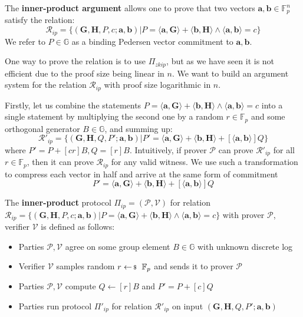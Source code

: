 \documentclass[../lecture-notes-148x210.tex]{subfiles}
\begin{document}
The \textbf{inner-product argument} allows one to prove that two vectors $\mathbf{a,b} \in \mathbb{F}_p^n$ satisfy the relation:
$$\mathcal{R}_{ip} = \{ (\mathbf{G,H}, P, c; \mathbf{a,b}) \vert P = \langle \mathbf{a,G} \rangle + \langle \mathbf{b,H} \rangle \wedge \langle \mathbf{a,b} \rangle = c \}$$
We refer to $P \in \mathbb{G}$ as a binding Pedersen vector commitment to $\mathbf{a,b}$.

One way to prove the relation is to use $\Pi_{zkip}$, but as we have seen it is not efficient due to the proof size being linear in $n$. We want to build an argument system for the relation $\mathcal{R}_{ip}$ with proof size logarithmic in $n$.

Firstly, let us combine the statements $P = \langle \mathbf{a,G} \rangle + \langle \mathbf{b,H} \rangle \wedge \langle \mathbf{a,b} \rangle = c$ into a single statement by multiplying the second one by a random $r \in \mathbb{F}_p$ and some orthogonal generator $B \in \mathbb{G}$, and summing up:
$$
\mathcal{R}'_{ip} = \{ (\mathbf{G,H}, Q, P'; \mathbf{a,b}) \vert P' = \langle \mathbf{a,G} \rangle + \langle \mathbf{b,H} \rangle + [\langle \mathbf{a,b} \rangle]Q \}
$$
where $P' = P + [cr]B, Q=[r]B$. Intuitively, if prover $\mathcal{P}$ can prove $\mathcal{R}'_{ip}$ for all $r \in \mathbb{F}_p$, then it can prove $\mathcal{R}_{ip}$ for any valid witness. We use such a transformation to compress each vector in half and arrive at the same form of commitment
$$P' = \langle \mathbf{a,G} \rangle + \langle \mathbf{b,H} \rangle + [\langle \mathbf{a,b} \rangle]Q$$

\begin{definition}
    The \textbf{inner-product} protocol $\Pi_{ip} = (\mathcal{P}, \mathcal{V})$ for relation $\mathcal{R}_{ip} = \{ (\mathbf{G,H}, P, c; \mathbf{a,b}) \vert P = \langle \mathbf{a,G} \rangle + \langle \mathbf{b,H} \rangle \wedge \langle \mathbf{a,b} \rangle = c \}$ with prover $\mathcal{P}$, verifier $\mathcal{V}$ is defined as follows:
    \begin{itemize}
        \item Parties $\mathcal{P, V}$ agree on some group element $B \in \mathbb{G}$ with unknown discrete log
        \item Verifier $\mathcal{V}$ samples random $r \leftarrowS \mathbb{F}_p$ and sends it to prover $\mathcal{P}$
        \item Parties $\mathcal{P, V}$ compute $Q \gets [r]B$ and $P' = P + [c]Q$
        \item Parties run protocol $\Pi'_{ip}$ for relation $\mathcal{R}'_{ip}$ on input $(\mathbf{G,H}, Q, P'; \mathbf{a,b})$
    \end{itemize}
\end{definition}
\end{document}
